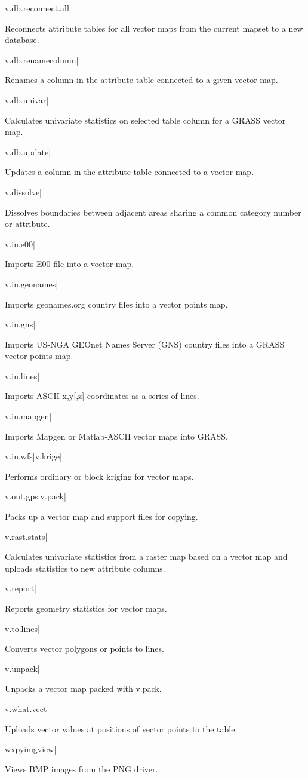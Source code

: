 v.db.reconnect.all|

Reconnects attribute tables for all vector maps from the current mapset
to a new database.

v.db.renamecolumn|

Renames a column in the attribute table connected to a given vector
map.

v.db.univar|

Calculates univariate statistics on selected table column for a GRASS
vector map.

v.db.update|

Updates a column in the attribute table connected to a vector map.

v.dissolve|

Dissolves boundaries between adjacent areas sharing a common category
number or attribute.

v.in.e00|

Imports E00 file into a vector map.

v.in.geonames|

Imports geonames.org country files into a vector points map.

v.in.gns|

Imports US-NGA GEOnet Names Server (GNS) country files into a GRASS
vector points map.

v.in.lines|

Imports ASCII x,y{[},z{]} coordinates as a series of lines.

v.in.mapgen|

Imports Mapgen or Matlab-ASCII vector maps into GRASS.

v.in.wfs|v.krige|

Performs ordinary or block kriging for vector maps.

v.out.gps|v.pack|

Packs up a vector map and support files for copying.

v.rast.stats|

Calculates univariate statistics from a raster map based on a vector
map and uploads statistics to new attribute columns.

v.report|

Reports geometry statistics for vector maps.

v.to.lines|

Converts vector polygons or points to lines.

v.unpack|

Unpacks a vector map packed with v.pack.

v.what.vect|

Uploads vector values at positions of vector points to the table.

wxpyimgview|

Views BMP images from the PNG driver.
